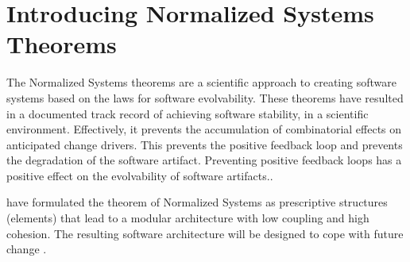 \section{Introducing Normalized Systems Theorems}

The Normalized Systems theorems are a scientific approach to creating software systems
based on the laws for software evolvability. These theorems have resulted in a documented
track record of achieving software stability, in a scientific environment. Effectively, it
prevents the accumulation of combinatorial effects on anticipated change drivers. This
prevents the positive feedback loop and prevents the degradation of the software artifact.
Preventing positive feedback loops has a positive effect on the evolvability of software
artifacts.\parencite[]{mannaert_normalized_2009}. 

\citeauthor[]{mannaert_normalized_2009} have formulated the theorem of Normalized Systems
as prescriptive structures (elements) that lead to a modular architecture with low
coupling and high cohesion. The resulting software architecture will be designed to cope
with future change \parencites[]{mannaert_normalized_2009}.